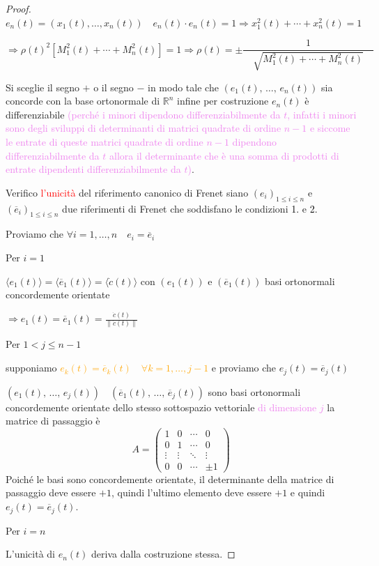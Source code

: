 \begin{proof}
        $e_n(t) = \left(x_1(t), \dots, x_n(t) \right) \quad e_n(t) \cdot e_n(t) = 1 \Rightarrow x_1^2(t) + \cdots + x_n^2(t) = 1$

        $\displaystyle \Rightarrow \rho(t)^2 \left[ M_1^2(t) + \cdots + M_n^2(t) \right] = 1 \Rightarrow \rho(t) = \pm \dfrac{1}{\quad \sqrt{M_1^2(t) + \cdots + M_n^2(t)} \quad}$

        Si sceglie il segno $+$ o il segno $-$ in modo tale che $\left(e_1(t), \, \dots, \, e_n(t) \right)$ sia concorde con la
        base ortonormale di $\mathbb{R}^n$ infine per costruzione $e_n(t)$ è differenziabile \textcolor{violet}{(perché i minori dipendono differenziabilmente da $t$, infatti i minori sono 
        degli sviluppi di determinanti di matrici quadrate di ordine $n-1$ e siccome le entrate di queste matrici quadrate di ordine $n-1$ dipendono differenziabilmente da $t$ allora 
        il determinante che è una somma di prodotti di entrate dipendenti differenziabilmente da $t$)}.

        Verifico \textcolor{red}{l'unicità} del riferimento canonico di Frenet siano $\left(e_i\right)_{1 \leq i \leq n}$ e $\left(\overline{e}_i\right)_{1 \leq i \leq n}$ due riferimenti di Frenet 
        che soddisfano le condizioni \textcolor{black}{1.} e \textcolor{black}{2.}

        Proviamo che $\forall i = 1, \dots, n \quad e_i = \overline{e}_i$

        Per $i=1$ 
        
        $\langle e_1(t) \rangle = \langle \overline{e}_1(t) \rangle = \langle \dot{c}(t) \rangle$ con $\left(e_1(t)\right)$ e $\left(\overline{e}_1(t)\right)$ basi ortonormali
        concordemente orientate
        
        $\displaystyle \Rightarrow e_1(t) = \overline{e}_1(t) = \frac{\dot{c}(t)}{\|\dot{c}(t)\|}$

        Per $1<j\leq n-1$ 
        
        supponiamo \textcolor{orange}{$e_k(t) = \overline{e}_k(t) \quad \forall k = 1, \dots, j-1$} e proviamo che $e_j(t) = \overline{e}_j(t)$

        $\left(e_1(t), \, \dots , \, e_j(t)\right) \quad \left(\overline{e}_1(t), \, \dots , \, \overline{e}_j(t)\right)$ sono basi ortonormali concordemente orientate dello stesso
        sottospazio vettoriale \textcolor{violet}{ di dimensione $j$} la matrice di passaggio è 
        \[ A = \begin{pmatrix}
        1 & 0 & \cdots & 0 \\
        0 & 1 & \cdots & 0 \\
        \vdots & \vdots & \ddots & \vdots \\
        0 & 0 & \cdots & \pm 1
        \end{pmatrix} \]
        Poiché le basi sono concordemente orientate, il determinante della matrice di passaggio deve essere $+1$, quindi l'ultimo elemento deve essere $+1$ e quindi $e_j(t) = \overline{e}_j(t)$.

        Per $i=n$ 

        L'unicità di $e_n(t)$ deriva dalla costruzione stessa.
        \end{proof}
